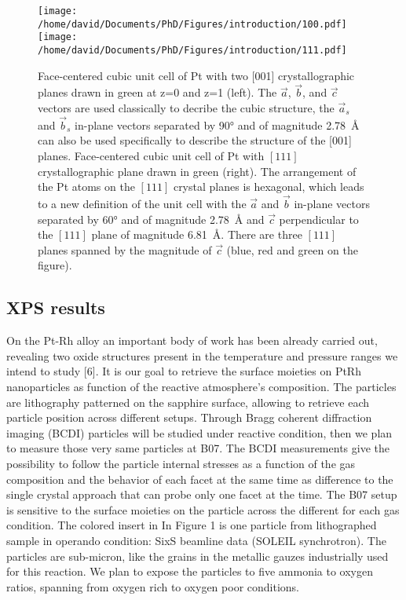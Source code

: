 \begin{figure}[!htb]
    \centering
    \texttt{[image: /home/david/Documents/PhD/Figures/introduction/100.pdf]}
    \texttt{[image: /home/david/Documents/PhD/Figures/introduction/111.pdf]}
    \caption{
        Face-centered cubic unit cell of Pt with two [001] crystallographic planes drawn in green at z=0 and z=1 (left).
        The $\vec{a}$, $\vec{b}$, and $\vec{c}$ vectors are used classically to decribe the cubic structure, the $\vec{a}_s$ and $\vec{b}_s$ in-plane vectors separated by \ang{90} and of magnitude \qty{2.78}{\angstrom} can also be used specifically to describe the structure of the [001] planes.
        Face-centered cubic unit cell of Pt with $[111]$ crystallographic plane drawn in green (right).
        The arrangement of the Pt atoms on the $[111]$ crystal planes is hexagonal, which leads to a new definition of the unit cell with the $\vec{a}$ and $\vec{b}$ in-plane vectors separated by \ang{60} and of magnitude \qty{2.78}{\angstrom} and $\vec{c}$ perpendicular to the $[111]$ plane of magnitude \qty{6.81}{\angstrom}.
        There are three $[111]$ planes spanned by the magnitude of $\vec{c}$ (blue, red and green on the figure).
    }
    \label{fig:Cubic100Hex111}
\end{figure}

\subsection{XPS results} \label{sec:XPS111}

On the Pt-Rh alloy an important body of work has been
already carried out, revealing two oxide structures present in the temperature and
pressure ranges we intend to study [6].
It is our goal to retrieve the surface moieties on PtRh nanoparticles as function of the reactive atmosphere’s composition.
The particles are lithography patterned on the sapphire surface, allowing to retrieve each particle position across different setups.
Through Bragg coherent diffraction imaging (BCDI) particles will be studied under reactive condition, then we plan to measure those very same particles at B07. The BCDI measurements give the possibility to follow the particle internal stresses as a function of the gas composition and the behavior of each facet at the same time as difference to the single crystal approach that can probe only one facet at the time.
The B07 setup is sensitive to the surface moieties on the particle across the different for each gas condition.
The colored insert in In Figure 1 is one particle from lithographed sample in operando condition: SixS beamline data (SOLEIL synchrotron).
The particles are sub-micron, like the grains in the metallic gauzes industrially used for this reaction. We plan to expose the particles to five ammonia to oxygen ratios, spanning from oxygen rich to oxygen poor conditions.


